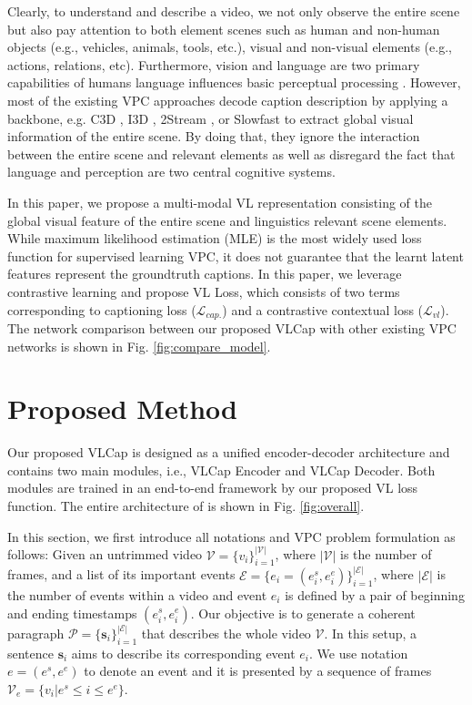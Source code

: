 \documentclass{article}
\begin{document}
Clearly, to understand and describe a video, we not only observe the entire scene but also pay attention to both element scenes such as human and non-human objects (e.g., vehicles, animals, tools, etc.), visual and non-visual elements (e.g., actions, relations, etc). Furthermore, vision and language are two primary capabilities of humans language influences basic perceptual processing \cite{Lupyan2020}. However, most of the existing VPC approaches \cite{zhou2018end, park2019adversarial, dai2019transformer, zhou2019grounded, lei2020mart, wang2021end} decode caption description by applying a backbone, e.g. C3D \cite{C3D}, I3D \cite{carreira2017quo}, 2Stream \cite{2_stream_1, 2_stream_2}, or Slowfast \cite{SlowFast} to extract global visual information of the entire scene. By doing that, they ignore the interaction between the entire scene and relevant elements as well as disregard the fact that language and perception are two central cognitive systems. 

In this paper, we propose a multi-modal VL representation consisting of the global visual feature of the entire scene and linguistics relevant scene elements. While maximum likelihood estimation (MLE) is the most widely used loss function for supervised learning VPC, it does not guarantee that the learnt latent features represent the groundtruth captions. In this paper, we leverage contrastive learning \cite{hjelm2019learning, tian2020contrastive} and propose VL Loss, which consists of two terms corresponding to captioning loss ($\mathcal{L}_{cap.}$) and a contrastive contextual loss ($\mathcal{L}_{vl}$). The network comparison between our proposed VLCap with other existing VPC networks is shown in Fig. \ref{fig:compare_model}.

\vspace{-3.8mm}
\section{Proposed Method}
\vspace{-3mm}
Our proposed VLCap is designed as a unified encoder-decoder architecture and contains two main modules, i.e., VLCap Encoder and VLCap Decoder. Both modules are trained in an end-to-end framework by our proposed VL loss function. The entire architecture of \model is shown in Fig. \ref{fig:overall}.


In this section, we first introduce all notations and VPC problem formulation as follows: Given an untrimmed video $\mathcal{V}=\{v_i\}_{i=1}^\mathcal{|V|}$, where $|\mathcal{V}|$ is the number of frames, and a list of its important events $\mathcal{E}=\{e_i=(e^s_i, e^e_i)\}_{i=1}^{|\mathcal{E}|}$, where $|\mathcal{E}|$ is the number of events within a video and event $e_i$ is defined by a pair of beginning and ending timestamps $(e^s_i, e^e_i)$. Our objective is to generate a coherent paragraph $\mathcal{P}=\{\textbf{s}_i\}_{i=1}^{|\mathcal{E}|}$ that describes the whole video $\mathcal{V}$. In this setup, a sentence $\textbf{s}_i$ aims to describe its corresponding event $e_i$. We use notation $e = (e^s, e^e)$ to denote an event and it is presented by a sequence of frames $\mathcal{V}_e = \{v_i|e^s\leq i \leq e^e\}$.
\vspace{-3.2mm}
\end{document}
